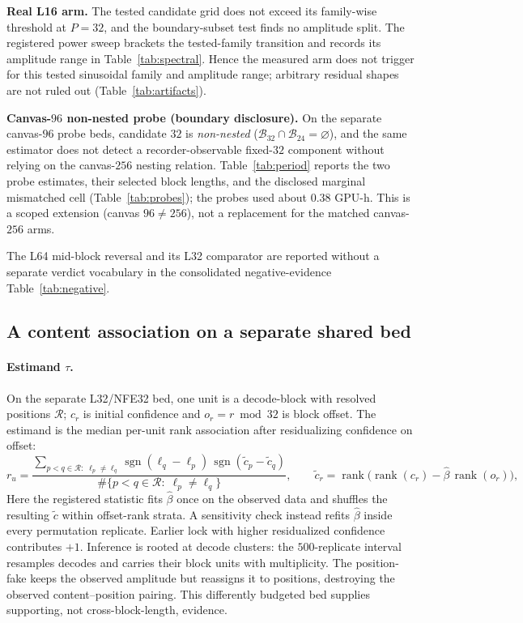 \documentclass{article}
\begin{document}
\textbf{Real L16 arm.} The tested candidate grid does not exceed its family-wise
threshold at $P=32$, and the boundary-subset test finds no amplitude split. The
registered power sweep brackets the tested-family transition and records its
amplitude range in Table~\ref{tab:spectral}. Hence the measured arm does not
trigger for this tested sinusoidal family and amplitude range; arbitrary residual
shapes are not ruled out (Table~\ref{tab:artifacts}).

\textbf{Canvas-$96$ non-nested probe (boundary disclosure).} On the separate
canvas-$96$ probe beds, candidate $32$ is \emph{non-nested} ($\mathcal
B_{32}\cap\mathcal B_{24}=\varnothing$), and the same estimator does not detect a
recorder-observable fixed-$32$ component without relying on the canvas-$256$
nesting relation. Table~\ref{tab:period} reports the two probe estimates,
their selected block lengths, and the disclosed marginal mismatched cell
(Table~\ref{tab:probes}); the probes used about $0.38$ GPU-h. This is a scoped
extension (canvas $96\ne256$), not a
replacement for the matched canvas-$256$ arms.

\FloatBarrier


The L64 mid-block reversal and its L32 comparator are reported without a separate
verdict vocabulary in the consolidated negative-evidence
Table~\ref{tab:negative}.

\subsection{A content association on a separate shared bed}\label{sec:content}

\paragraph{Estimand $\tau$.}
On the separate L32/NFE32 bed, one unit is a decode-block with resolved positions
$\mathcal R$; $c_r$ is initial confidence and $o_r=r\bmod32$ is block offset.
The estimand is the median per-unit rank association after residualizing confidence
on offset:
\begin{equation}
r_u=\frac{\sum_{p<q\in\mathcal R:\;\ell_p\ne\ell_q}
\operatorname{sgn}(\ell_q-\ell_p)\,\operatorname{sgn}(\tilde c_p-\tilde c_q)}
{\#\{p<q\in\mathcal R:\;\ell_p\ne\ell_q\}},
\qquad
\tilde c_r=\operatorname{rank}\!\big(\operatorname{rank}(c_r)-\hat\beta\,\operatorname{rank}(o_r)\big),
\label{eq:tau}
\end{equation}
Here the registered statistic fits $\hat\beta$ once on the observed data and
shuffles the resulting $\tilde c$ within offset-rank strata. A sensitivity check
instead refits $\hat\beta$ inside every permutation replicate. Earlier lock with
higher residualized confidence contributes $+1$.
Inference is rooted at decode clusters: the $500$-replicate interval resamples
decodes and carries their block units with multiplicity. The position-fake keeps
the observed amplitude but reassigns it to positions, destroying the observed
content--position pairing. This differently budgeted bed supplies supporting,
not cross-block-length, evidence.
\end{document}
